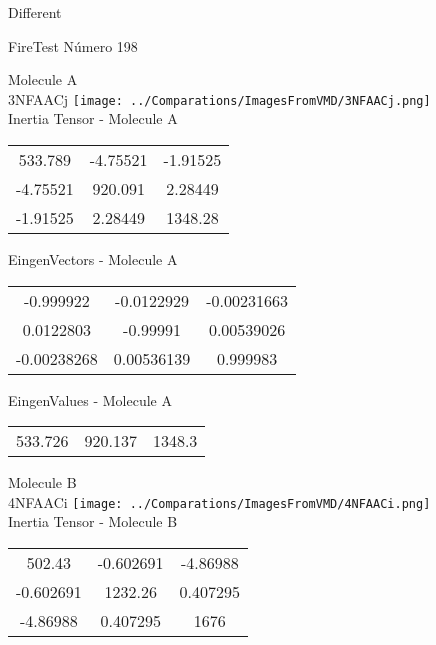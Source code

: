 \begin{center}
\vtab
\vtab
\textcolor{NavyBlue}{\Large Different}
\end{center}

 \newpage

\vtab[-2cm]
\begin{center}
{\large FireTest \tab Número 198}
\end{center}
\begin{multicols}{2}
\begin{center}

Molecule A \\ 
3NFAACj
\texttt{[image: ../Comparations/ImagesFromVMD/3NFAACj.png]}
\\
Inertia Tensor - Molecule A \\
\vtab

\begin{tabular}{|c c c|}
533.789	 & 	-4.75521	 & 	-1.91525	 \\
-4.75521	 & 	920.091	 & 	2.28449	 \\
-1.91525	 & 	2.28449	 & 	1348.28
\end{tabular}

\vtab
 EingenVectors - Molecule A     \\
\vtab
\begin{tabular}{|c c c|}
-0.999922	 & 	-0.0122929	 & 	-0.00231663	 \\
0.0122803	 & 	-0.99991	 & 	0.00539026	 \\
-0.00238268	 & 	0.00536139	 & 	0.999983
\end{tabular}

\vtab
 EingenValues - Molecule A     \\
\vtab
\begin{tabular}{|c c c|}
533.726	 & 	920.137	 & 	1348.3	 \\
\end{tabular}
\columnbreak

Molecule B \\ 
4NFAACi
\texttt{[image: ../Comparations/ImagesFromVMD/4NFAACi.png]}
\\
Inertia Tensor - Molecule B \\
\vtab

\begin{tabular}{|c c c|}
502.43	 & 	-0.602691	 & 	-4.86988	 \\
-0.602691	 & 	1232.26	 & 	0.407295	 \\
-4.86988	 & 	0.407295	 & 	1676
\end{tabular}


\end{center}
\end{multicols}
